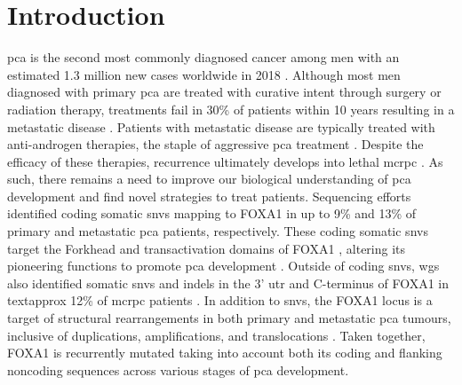 \section{Introduction}

\Gls{pca} is the second most commonly diagnosed cancer among men with an estimated 1.3 million new cases worldwide in 2018 \cite{brayGlobalCancerStatistics2018}.
Although most men diagnosed with primary \gls{pca} are treated with curative intent through surgery or radiation therapy, treatments fail in 30\% of patients within 10 years \cite{boorjianLongTermOutcomeRadical2007} resulting in a metastatic disease \cite{litwinDiagnosisTreatmentProstate2017}.
Patients with metastatic disease are typically treated with anti-androgen therapies, the staple of aggressive \gls{pca} treatment \cite{attardProstateCancer2016}.
Despite the efficacy of these therapies, recurrence ultimately develops into lethal \gls{mcrpc} \cite{attardProstateCancer2016}.
As such, there remains a need to improve our biological understanding of \gls{pca} development and find novel strategies to treat patients.
Sequencing efforts identified coding somatic \glspl{snv} mapping to FOXA1 in up to 9\% \cite{abeshouseMolecularTaxonomyPrimary2015,fraserGenomicHallmarksLocalized2017,barbieriExomeSequencingIdentifies2012, grassoMutationalLandscapeLethal2012,paroliaDistinctStructuralClasses2019,adamsFOXA1MutationsAlter2019} and 13\% \cite{paroliaDistinctStructuralClasses2019,adamsFOXA1MutationsAlter2019,robinsonIntegrativeClinicalGenomics2015} of primary and metastatic \gls{pca} patients, respectively.
These coding somatic \glspl{snv} target the Forkhead and transactivation domains of FOXA1 \cite{robinsonFOXA1MutationsHormonedependent2013}, altering its pioneering functions to promote \gls{pca} development \cite{adamsFOXA1MutationsAlter2019,gaoForkheadDomainMutations2019}.
Outside of coding \glspl{snv}, \gls{wgs} also identified somatic \glspl{snv} and indels in the 3' \gls{utr} and C-terminus of FOXA1 in \\textapprox 12\% of \gls{mcrpc} patients \cite{annalaFrequentMutationFOXA12018}.
In addition to \glspl{snv}, the FOXA1 locus is a target of structural rearrangements in both primary and metastatic \gls{pca} tumours, inclusive of duplications, amplifications, and translocations \cite{paroliaDistinctStructuralClasses2019,adamsFOXA1MutationsAlter2019}.
Taken together, FOXA1 is recurrently mutated taking into account both its coding and flanking noncoding sequences across various stages of \gls{pca} development.

